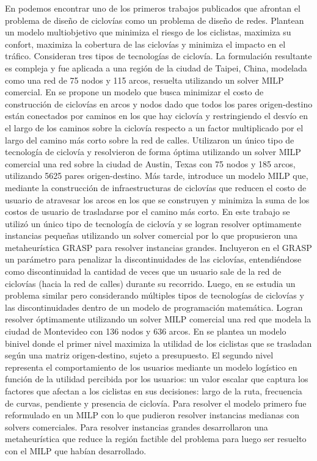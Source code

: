 \documentclass{article}
\begin{document}
  En \cite{Lin2013} podemos encontrar uno de los primeros trabajos publicados que afrontan el problema de diseño de ciclovías como un problema de diseño de redes. Plantean un modelo multiobjetivo que minimiza el riesgo de los ciclistas, maximiza su confort, maximiza la cobertura de las ciclovías y minimiza el impacto en el tráfico. Consideran tres tipos de tecnologías de ciclovía. La formulación resultante es compleja y fue aplicada a una región de la ciudad de Taipei, China, modelada como una red de 75 nodos y 115 arcos, resuelta utilizando un solver MILP comercial. En \cite{Duthie2014} se propone un modelo que busca minimizar el costo de construcción de ciclovías en arcos y nodos dado que todos los pares origen-destino están conectados por caminos en los que hay ciclovía y restringiendo el desvío en el largo de los caminos sobre la ciclovía respecto a un factor multiplicado por el largo del camino más corto sobre la red de calles. Utilizaron un único tipo de tecnología de ciclovía y resolvieron de forma óptima utilizando un solver MILP comercial una red sobre la ciudad de Austin, Texas con 75 nodos y 185 arcos, utilizando 5625 pares origen-destino. Más tarde, \cite{mauttone2017} introduce un modelo MILP que, mediante la construcción de infraestructuras de ciclovías que reducen el costo de usuario de atravesar los arcos en los que se construyen y minimiza la suma de los costos de usuario de trasladarse por el camino más corto. En este trabajo se utilizó un único tipo de tecnología de ciclovía y se logran resolver optimamente instancias pequeñas utilizando un solver comercial por lo que propusieron una metaheurística GRASP para resolver instancias grandes. Incluyeron en el GRASP un parámetro para penalizar la discontinuidades de las ciclovías, entendiéndose como discontinuidad la cantidad de veces que un usuario sale de la red de ciclovías (hacia la red de calles) durante su recorrido. Luego, en \cite{baya2021} se estudia un problema similar pero considerando múltiples tipos de tecnologías de ciclovías y las discontinuidades dentro de un modelo de programación matemática. Logran resolver óptimamente utilizando un solver MILP comercial una red que modela la ciudad de Montevideo con 136 nodos y 636 arcos. En \cite{liu2019} se plantea un modelo binivel donde el primer nivel maximiza la utilidad de los ciclistas que se trasladan según una matriz origen-destino, sujeto a presupuesto. El segundo nivel representa el comportamiento de los usuarios mediante un modelo logístico en función de la utilidad percibida por los usuarios: un valor escalar que captura los factores que afectan a los ciclistas en sus decisiones: largo de la ruta, frecuencia de curvas, pendiente y presencia de ciclovía. Para resolver el modelo primero fue reformulado en un MILP con lo que pudieron resolver instancias medianas con solvers comerciales. Para resolver instancias grandes desarrollaron una metaheurística que reduce la región factible del problema para luego ser resuelto con el MILP que habían desarrollado.
\end{document}
